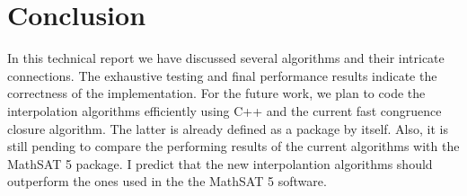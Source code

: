 \section{Conclusion}

In this technical report we have discussed several algorithms and their intricate connections.
The exhaustive testing and final performance results indicate the correctness of the
implementation. For the future work, we plan to code the interpolation algorithms
efficiently using C++ and the current fast congruence closure algorithm. The latter
is already defined as a package by itself. Also, it is still pending to compare
the performing results of the current algorithms with the MathSAT 5 package. I predict
that the new interpolantion algorithms should outperform the ones used in the the MathSAT 5
software.
